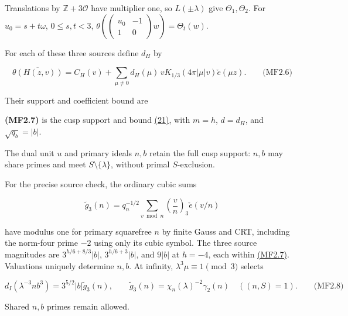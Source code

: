 Translations by \(\mathbb Z+3\mathcal O\) have multiplier one, so \(L(\pm\lambda)\) give \(\Theta_1,\Theta_2\). For \(u_0=s+t\omega\), \(0\le s,t<3\), \(\theta(\left(\begin{smallmatrix}u_0&-1\\1&0\end{smallmatrix}\right)w)=\Theta_t(w)\).

For each of these three sources define \(d_H\) by

\hypertarget{mf:eq:B2.6}{}

\label{mf:eq:B2.6}

\[
\overline{\theta(H(z,v))}
=C_H(v)+\sum_{\mu\ne0}d_H(\mu)\,vK_{1/3}(4\pi|\mu|v)\check e(\mu z).
\qquad\text{(MF2.6)}
\]

Their support and coefficient bound are

\hypertarget{mf:eq:B2.7}{}

\label{mf:eq:B2.7}

\textbf{(MF2.7)} is the cusp support and bound \protect\hyperlink{cf:eq:B.5}{(21)}, with \(m=h\), \(d=d_H\), and \(\sqrt{q_b}=|b|\).

The dual unit \(u\) and primary ideals \(n,b\) retain the full cusp support: \(n,b\) may share primes and meet \(S\setminus\{\lambda\}\), without primal \(S\)-exclusion.

For the precise source check, the ordinary cubic sums

\[
\widetilde g_3(n)=q_n^{-1/2}\sum_{v\bmod n}\left(\frac vn\right)_3\check e(v/n)
\]

have modulus one for primary squarefree \(n\) by finite Gauss and CRT, including the norm-four prime \(-2\) using only its cubic symbol. The three source magnitudes are \(3^{h/6+8/3}|b|\), \(3^{h/6+3}|b|\), and \(9|b|\) at \(h=-4\), each within \protect\hyperlink{mf:eq:B2.7}{(MF2.7)}. Valuations uniquely determine \(n,b\). At infinity, \(\lambda^3\mu\equiv1\pmod3\) selects

\hypertarget{mf:eq:B2.8}{}

\label{mf:eq:B2.8}

\[
d_I(\lambda^{-3}nb^3)=3^{5/2}|b|\widetilde g_3(n),\qquad
\widetilde g_3(n)=\chi_n(\lambda)^{-2}\gamma_2(n)\quad((n,S)=1).
\qquad\text{(MF2.8)}
\]

Shared \(n,b\) primes remain allowed.

\hypertarget{all-nonzero-element-rows-use-one-fixed-modulus}{}

\label{all-nonzero-element-rows-use-one-fixed-modulus}

